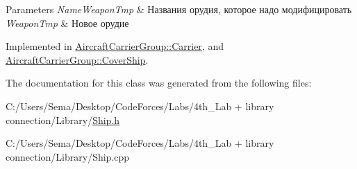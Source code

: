 \begin{DoxyParams}{Parameters}
{\em Name\+Weapon\+Tmp} & Названия орудия, которое надо модифицировать \\
\hline
{\em Weapon\+Tmp} & Новое орудие \\
\hline
\end{DoxyParams}


Implemented in \mbox{\hyperlink{class_aircraft_carrier_group_1_1_carrier_a1ed41e4f12ea2941112fa17adf8eb7a0}{Aircraft\+Carrier\+Group\+::\+Carrier}}, and \mbox{\hyperlink{class_aircraft_carrier_group_1_1_cover_ship_a135b4e20acbdb6bfbcb2cbb6df855d09}{Aircraft\+Carrier\+Group\+::\+Cover\+Ship}}.



The documentation for this class was generated from the following files\+:\begin{DoxyCompactItemize}
\item 
C\+:/\+Users/\+Sema/\+Desktop/\+Code\+Forces/\+Labs/4th\+\_\+\+Lab + library connection/\+Library/\mbox{\hyperlink{_ship_8h}{Ship.\+h}}\item 
C\+:/\+Users/\+Sema/\+Desktop/\+Code\+Forces/\+Labs/4th\+\_\+\+Lab + library connection/\+Library/Ship.\+cpp\end{DoxyCompactItemize}
